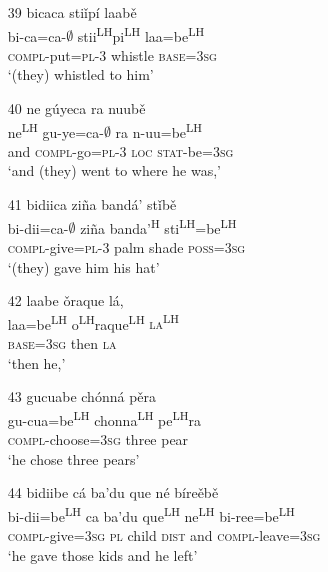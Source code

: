 \begin{itemize}
\item[39]
\glll bicaca sti\v{i}p\'{i} laab\v{e} \\
bi-ca=ca-$\emptyset$ stii\textsuperscript{LH}pi\textsuperscript{LH} laa=be\textsuperscript{LH} \\
\textsc{compl}-put=\textsc{pl}-\textsc{3} whistle \textsc{base}=\textsc{3sg} \\
\glt `(they) whistled to him'


\item[40]
\glll ne g\'{u}yeca ra nuub\v{e} \\
ne\textsuperscript{LH} gu-ye=ca-$\emptyset$ ra n-uu=be\textsuperscript{LH} \\
and \textsc{compl}-go=\textsc{pl}-\textsc{3} \textsc{loc} \textsc{stat}-be=\textsc{3sg} \\
\glt `and (they) went to where he was,'
 

\item[41]
\glll bidiica zi\~{n}a band\'{a}' st\v{i}b\v{e} \\
bi-dii=ca-$\emptyset$ zi\~{n}a banda'\textsuperscript{H} sti\textsuperscript{LH}=be\textsuperscript{LH} \\
\textsc{compl}-give=\textsc{pl}-\textsc{3} palm shade \textsc{poss}=\textsc{3sg} \\
\glt `(they) gave him his hat'


\item[42]
\glll laabe \v{o}raque l\'{a},  \\
laa=be\textsuperscript{LH} o\textsuperscript{LH}raque\textsuperscript{LH} \textsc{la\textsuperscript{LH}}  \\
\textsc{base}=\textsc{3sg} then \textsc{la} \\
\glt `then he,'


\item[43]
\glll gucuabe ch\'{o}nn\'{a} p\v{e}ra \\
gu-cua=be\textsuperscript{LH} chonna\textsuperscript{LH} pe\textsuperscript{LH}ra \\
\textsc{compl}-choose=\textsc{3sg} three pear \\
\glt `he chose three pears'


\item[44]
\glll bidiibe c\'{a} ba'du que n\'{e} b\'{i}re\v{e}b\v{e}  \\
bi-dii=be\textsuperscript{LH}  ca ba'du que\textsuperscript{LH}  ne\textsuperscript{LH}  bi-ree=be\textsuperscript{LH}   \\
\textsc{compl}-give=\textsc{3sg} \textsc{pl} child \textsc{dist} and \textsc{compl}-leave=\textsc{3sg} \\
\glt `he gave those kids and he left'



\end{itemize}
